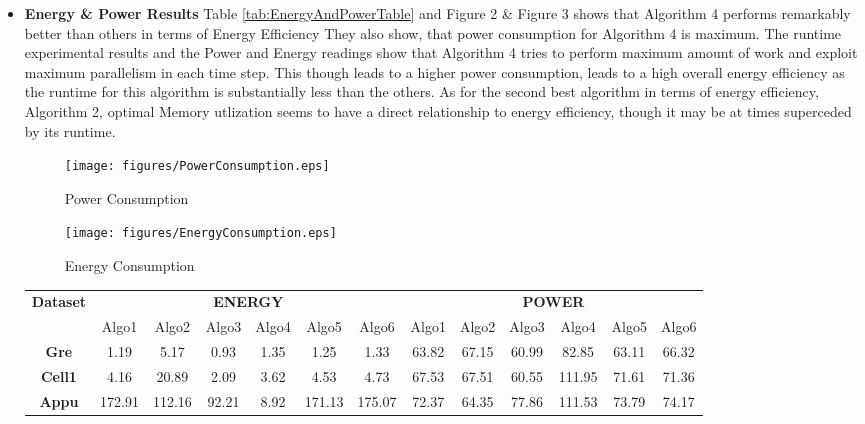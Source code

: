 \begin{itemize}
\item
\textbf{Energy \& Power Results}
Table \ref{tab:EnergyAndPowerTable} and Figure 2 \& Figure 3 shows 
that Algorithm 4 performs remarkably better than others in terms of Energy Efficiency 
They also show, that power consumption for Algorithm 4 is maximum. The runtime
experimental results and the Power and Energy readings show that Algorithm 4 tries to perform
maximum amount of work and exploit maximum parallelism in each time step. This though 
leads to a higher power consumption, leads to a high overall energy efficiency 
as the runtime for this algorithm is substantially less than the others.
As for the second best algorithm in terms of energy efficiency, Algorithm 2,
optimal Memory utlization seems to have a direct relationship to energy efficiency,
though it may be at times superceded by its runtime.
\begin{figure}[t]
    \centering
    \texttt{[image: figures/PowerConsumption.eps]}
    \caption{Power Consumption}
    \label{fig:Power Consumption}
\end{figure}
\begin{figure}[t]
    \centering
    \texttt{[image: figures/EnergyConsumption.eps]}
    \caption{Energy Consumption}
    \label{fig:Energy Consumption}
\end{figure}
\begin{table}[th]
\small
\centering
\begin{tabular}{ c|c|c|c|c|c|c|c|c|c|c|c|c| }
\hline
\multicolumn{1}{|c|}{\textbf{Dataset}} &
\multicolumn{6}{c}{\textbf{ENERGY}}&
  \multicolumn{6}{|c|}{\textbf{POWER}} \\
  \cline{2-13}
  \multicolumn{1}{|c|}{} &
  Algo1 & Algo2 & Algo3 & Algo4 & Algo5 & Algo6 & Algo1 & Algo2 & Algo3 & Algo4 & Algo5 & Algo6\\\hline
    \hline
  \multicolumn{1}{|c|}{\textbf{Gre}}
& 1.19 & 5.17 & \cellcolor{blue!25}0.93 & 1.35 & 1.25 & 1.33 & 63.82 & 67.15 & \cellcolor{green!25}60.99 & 82.85 & 63.11 & 66.32 \\ \hline
  \multicolumn{1}{|c|}{\textbf{Cell1}}
& 4.16 & 20.89 & \cellcolor{blue!25}2.09 & 3.62 & 4.53 & 4.73 & 67.53 & 67.51 & \cellcolor{green!25}60.55 & 111.95 & 71.61 & 71.36\\ \hline
  \multicolumn{1}{|c|}{\textbf{Appu}}
& 172.91 & 112.16 & 92.21 & \cellcolor{blue!25}8.92 & 171.13 & 175.07 & 72.37 & \cellcolor{green!25}64.35 & 77.86 & 111.53 & 73.79 & 74.17\\ \hline

\end{tabular}
\end{table}
\end{itemize}
